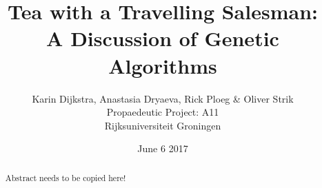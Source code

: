 \documentclass[11pt,a4paper]{report}
\title{Tea with a Travelling Salesman:\\
	\large A Discussion of Genetic Algorithms}
\author{Karin Dijkstra, Anastasia Dryaeva, Rick Ploeg \& Oliver Strik\\
Propaedeutic Project: A11\\
Rijksuniversiteit Groningen}
\date{June 6 2017}
\begin{document}
\maketitle

\begin{abstract}
Abstract needs to be copied here!
\end{abstract}

\tableofcontents

%

%

%
%
%
\end{document}
